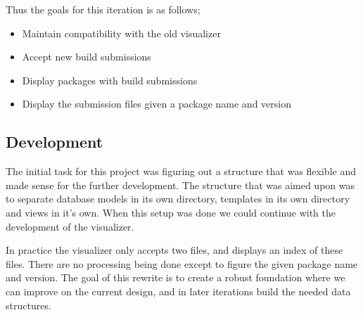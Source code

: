 \documentclass[../Main/thesis.tex]{subfiles}
\begin{document}
Thus the goals for this iteration is as follows;

\begin{itemize}
    \item Maintain compatibility with the old visualizer
    \item Accept new build submissions
    \item Display packages with build submissions
    \item Display the submission files given a package name and version
\end{itemize}

\subsection*{Development}%
\label{sub:first_iteration_development}
The initial task for this project was figuring out a structure that was flexible
and made sense for the further development. The structure that was aimed upon
was to separate database models in its own directory, templates in its own
directory and views in it's own. When this setup was done we could continue with
the development of the visualizer.

In practice the visualizer only accepts two files, and displays an index of
these files. There are no processing being done except to figure the given
package name and version. The goal of this rewrite is to create a robust
foundation where we can improve on the current design, and in later iterations
build the needed data structures.
\end{document}
